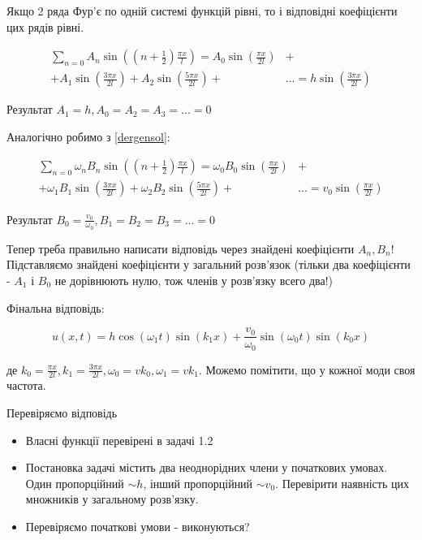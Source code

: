 Якщо 2 ряда Фур'є по одній системі функцій рівні, то і відповідні коефіцієнти цих рядів рівні.

\begin{equation}
    \begin{aligned}
        \sum_{n=0} A_n \sin \left( (n + \frac{1}{2}) \frac{\pi x}{l} \right) = A_0 \sin \left(\frac{\pi x}{2 l} \right) &+\\
        + A_1 \sin \left(\frac{3 \pi x}{2 l} \right) + A_2 \sin \left(\frac{5 \pi x}{2 l} \right) + &... = h \sin \left( \frac{3 \pi x}{2 l} \right)
    \end{aligned}
\end{equation}

Результат $A_1 = h, A_0 = A_2 = A_3 = ... = 0$

Аналогічно робимо з \ref{dergensol}: 

\begin{equation}
    \begin{aligned}
        \sum_{n=0} \omega_n B_n \sin \left( (n + \frac{1}{2}) \frac{\pi x}{l} \right) = \omega_0 B_0 \sin \left(\frac{\pi x}{2 l} \right) &+\\
        + \omega_1 B_1 \sin \left(\frac{3 \pi x}{2 l} \right) + \omega_2 B_2 \sin \left(\frac{5 \pi x}{2 l} \right) + &... = v_0 \sin \left( \frac{\pi x}{2 l} \right)
    \end{aligned}
\end{equation}

Результат $B_0 = \frac{v_0}{\omega_0}, B_1 = B_2 = B_3 = ... = 0$

Тепер треба правильно написати відповідь через знайдені коефіцієнти $A_n, B_n$! Підставляємо знайдені коефіцієнти у загальний розв'язок (тільки два коефіцієнти - $A_1$ і $B_0$ не дорівнюють нулю, тож членів у розв'язку всего два!)

Фінальна відповідь:

\begin{equation}
    u (x,t) = h \cos (\omega_1 t) \sin (k_1 x) + \frac{v_0}{\omega_0} \sin (\omega_0 t) \sin (k_0 x)
\end{equation}

де $k_0 = \frac{\pi x}{2 l}, k_1 = \frac{3 \pi x}{2 l}, \omega_0 = v k_0, \omega_1 = v k_1 $. Можемо помітити, що у кожної моди своя частота.

Перевіряємо відповідь

\begin{itemize}
    \item Власні функції перевірені в задачі 1.2
    \item Постановка задачі містить два неоднорідних члени у початкових умовах. Один пропорційний $\sim h$, інший пропорційний $\sim v_0$. Перевірити наявність цих множників у загальному розв'язку.
    \item Перевіряємо початкові умови - виконуються?

\end{itemize}

